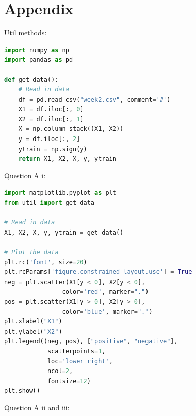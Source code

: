 \documentclass[10pt]{article}
\begin{document}
\section*{Appendix}
Util methods:
\begin{lstlisting}[language=Python]
import numpy as np
import pandas as pd

def get_data():
    # Read in data
    df = pd.read_csv("week2.csv", comment='#')
    X1 = df.iloc[:, 0]
    X2 = df.iloc[:, 1]
    X = np.column_stack((X1, X2))
    y = df.iloc[:, 2]
    ytrain = np.sign(y)
    return X1, X2, X, y, ytrain

\end{lstlisting}
Question A i:
\begin{lstlisting}[language=Python]
import matplotlib.pyplot as plt
from util import get_data

# Read in data
X1, X2, X, y, ytrain = get_data()

# Plot the data
plt.rc('font', size=20)
plt.rcParams['figure.constrained_layout.use'] = True
neg = plt.scatter(X1[y < 0], X2[y < 0],
                color='red', marker=".")
pos = plt.scatter(X1[y > 0], X2[y > 0],
                color='blue', marker=".")
plt.xlabel("X1")
plt.ylabel("X2")
plt.legend((neg, pos), ["positive", "negative"],
            scatterpoints=1,
            loc='lower right',
            ncol=2,
            fontsize=12)
plt.show()
\end{lstlisting}
Question A ii and iii:
\end{document}

